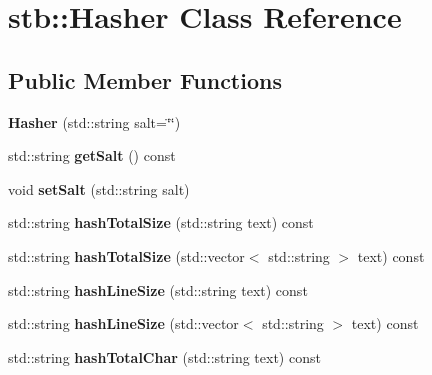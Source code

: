 \hypertarget{classstb_1_1Hasher}{\section{stb\+:\+:Hasher Class Reference}
\label{classstb_1_1Hasher}
}
\subsection*{Public Member Functions}
\begin{DoxyCompactItemize}
\item 
\hypertarget{classstb_1_1Hasher_af93a603d7f4e13674ef85e4924f04b49}{{\bfseries Hasher} (std\+::string salt=\char`\"{}\char`\"{})}\label{classstb_1_1Hasher_af93a603d7f4e13674ef85e4924f04b49}

\item 
\hypertarget{classstb_1_1Hasher_aa7930ebe7044e55a7876ef0c9b6f762a}{std\+::string {\bfseries get\+Salt} () const }\label{classstb_1_1Hasher_aa7930ebe7044e55a7876ef0c9b6f762a}

\item 
\hypertarget{classstb_1_1Hasher_ae72e728e85b143f296d4081cc789c535}{void {\bfseries set\+Salt} (std\+::string salt)}\label{classstb_1_1Hasher_ae72e728e85b143f296d4081cc789c535}

\item 
\hypertarget{classstb_1_1Hasher_a102a5aaac85758f4eee0cd09cb17570f}{std\+::string {\bfseries hash\+Total\+Size} (std\+::string text) const }\label{classstb_1_1Hasher_a102a5aaac85758f4eee0cd09cb17570f}

\item 
\hypertarget{classstb_1_1Hasher_af8387593324d09c253bb7a69a70df3fa}{std\+::string {\bfseries hash\+Total\+Size} (std\+::vector$<$ std\+::string $>$ text) const }\label{classstb_1_1Hasher_af8387593324d09c253bb7a69a70df3fa}

\item 
\hypertarget{classstb_1_1Hasher_a824163d6436457bcd7433bc61c786d91}{std\+::string {\bfseries hash\+Line\+Size} (std\+::string text) const }\label{classstb_1_1Hasher_a824163d6436457bcd7433bc61c786d91}

\item 
\hypertarget{classstb_1_1Hasher_a1e19b37b83a8a0f9e3bfeba0ae7d79a2}{std\+::string {\bfseries hash\+Line\+Size} (std\+::vector$<$ std\+::string $>$ text) const }\label{classstb_1_1Hasher_a1e19b37b83a8a0f9e3bfeba0ae7d79a2}

\item 
\hypertarget{classstb_1_1Hasher_a45c416099ff515b3ec5fe9a5527fff62}{std\+::string {\bfseries hash\+Total\+Char} (std\+::string text) const }\label{classstb_1_1Hasher_a45c416099ff515b3ec5fe9a5527fff62}


\end{DoxyCompactItemize}
